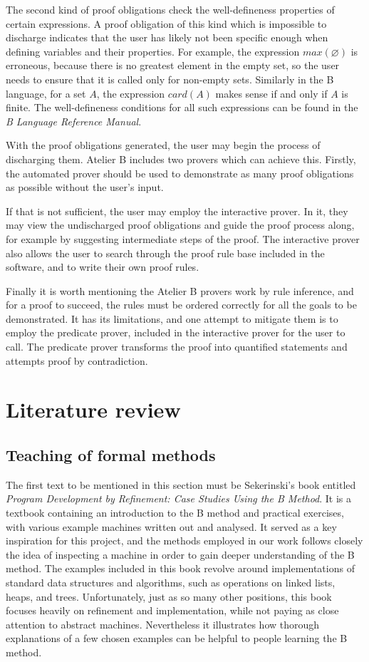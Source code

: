 \documentclass[12pt,journal,duplex]{IEEEtran}
\begin{document}
	The second kind of proof obligations check the well-defineness properties of certain expressions. A proof obligation of this kind which is impossible to discharge indicates that the user has likely not been specific enough when defining variables and their properties. For example, the expression $max(\varnothing)$ is erroneous, because there is no greatest element in the empty set, so the user needs to ensure that it is called only for non-empty sets. Similarly in the B language, for a set $A$, the expression $card(A)$ makes sense if and only if $A$ is finite. The well-defineness conditions for all such expressions can be found in the \emph{B Language Reference Manual}.

	With the proof obligations generated, the user may begin the process of discharging them. Atelier B includes two provers which can achieve this. Firstly, the automated prover should be used to demonstrate as many proof obligations as possible without the user's input.

	If that is not sufficient, the user may employ the interactive prover. In it, they may view the undischarged proof obligations and guide the proof process along, for example by suggesting intermediate steps of the proof. The interactive prover also allows the user to search through the proof rule base included in the software, and to write their own proof rules.

	Finally it is worth mentioning the Atelier B provers work by rule inference, and for a proof to succeed, the rules must be ordered correctly for all the goals to be demonstrated. It has its limitations, and one attempt to mitigate them is to employ the predicate prover, included in the interactive prover for the user to call. The predicate prover transforms the proof into quantified statements and attempts proof by contradiction.


	\section{Literature review}

	\subsection{Teaching of formal methods}
	
	The first text to be mentioned in this section must be Sekerinski's book entitled \emph{Program Development by Refinement: Case Studies Using the B Method}\cite{Sekerinski}. It is a textbook containing an introduction to the B method and practical exercises, with various example machines written out and analysed. It served as a key inspiration for this project, and the methods employed in our work follows closely the idea of inspecting a machine in order to gain deeper understanding of the B method. The examples included in this book revolve around implementations of standard data structures and algorithms, such as operations on linked lists, heaps, and trees. Unfortunately, just as so many other positions, this book focuses heavily on refinement and implementation, while not paying as close attention to abstract machines. Nevertheless it illustrates how thorough explanations of a few chosen examples can be helpful to people learning the B method. 
	
\end{document}
